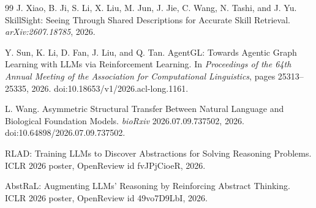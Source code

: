\begin{thebibliography}{99}
J. Xiao, B. Ji, S. Li, X. Liu, M. Jun, J. Jie, C. Wang, N. Tashi, and J. Yu. SkillSight: Seeing Through Shared Descriptions for Accurate Skill Retrieval. \emph{arXiv:2607.18785}, 2026.

Y. Sun, K. Li, D. Fan, J. Liu, and Q. Tan. AgentGL: Towards Agentic Graph Learning with LLMs via Reinforcement Learning. In \emph{Proceedings of the 64th Annual Meeting of the Association for Computational Linguistics}, pages 25313--25335, 2026. doi:10.18653/v1/2026.acl-long.1161.

L. Wang. Asymmetric Structural Transfer Between Natural Language and Biological Foundation Models. \emph{bioRxiv} 2026.07.09.737502, 2026. doi:10.64898/2026.07.09.737502.

RLAD: Training LLMs to Discover Abstractions for Solving Reasoning Problems. ICLR 2026 poster, OpenReview id fvJPjCioeR, 2026.

AbstRaL: Augmenting LLMs' Reasoning by Reinforcing Abstract Thinking. ICLR 2026 poster, OpenReview id 49vo7D9LbI, 2026.

\end{thebibliography}
